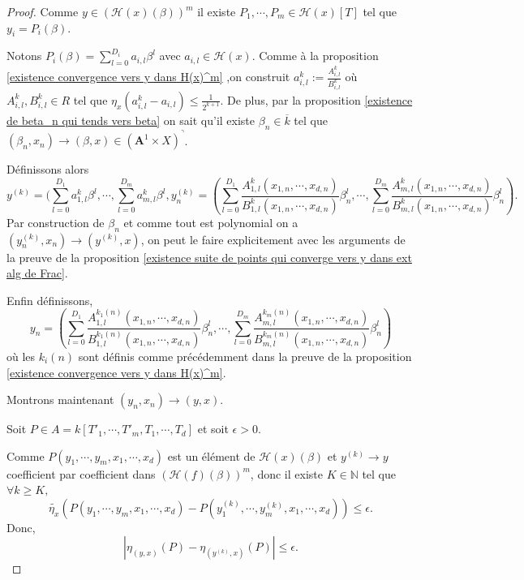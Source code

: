 \documentclass[11pt]{article}
\newcommand{\N}{\mathbb{N}}
\newcommand{\ana}{\mathbf{A}}
\begin{document}
\begin{proof}
Comme $y \in (\mathcal{H}(x)(\beta))^m$ il existe $P_{1}, \cdots, P_{m} \in \mathcal{H}(x)[T]$ tel que $y_{i} = P_{i}(\beta)$. 

Notons $P_{i} (\beta) = \sum\limits_{l=0}^{D_{i}} a_{i,l} \beta^l$ avec $a_{i,l} \in \mathcal{H}(x)$. Comme à la proposition \ref{existence convergence vers y dans H(x)^m} ,on construit $a_{i,l}^k := \frac{A_{i,l}^k}{B_{i,l}^k}$ où $A_{i,l}^k, B_{i,l}^k \in R$ tel que $\eta_x(a_{i,l}^k - a_{i,l}) \leq \frac{1}{2^{k+1}}$. De plus, par la proposition \ref{existence de beta_n qui tends vers beta} on sait qu'il existe $\beta_n \in \overline{k}$ tel que $(\beta_n, x_n) \rightarrow (\beta, x) \in (\ana^1\times X)^\urcorner$. 

Définissons alors 
\begin{equation*}
y^{(k)} = (\sum\limits_{l=0}^{D_{1}} a_{1,l}^k \beta^l, \cdots, \sum\limits_{l=0}^{D_{m}} a_{m,l}^k \beta^l  , y_n^{(k)} = (\sum\limits_{l=0}^{D_{1}} \frac{A_{1,l}^k(x_{1,n}, \cdots, x_{d,n})}{B_{1,l}^k(x_{1,n}, \cdots, x_{d,n})}\beta_n^l, \cdots, \sum\limits_{l=0}^{D_{m}} \frac{A_{m,l}^k(x_{1,n}, \cdots, x_{d,n})}{B_{m,l}^k(x_{1,n}, \cdots, x_{d,n})}\beta_n^l).
\end{equation*}
Par construction de $\beta_n$ et comme tout est polynomial on a $(y_n^{(k)}, x_n) \rightarrow (y^{(k)}, x)$, on peut le faire explicitement avec les arguments de la preuve de la proposition \ref{existence suite de points qui converge vers y dans ext alg de Frac}.

Enfin définissons, 
\begin{equation*}
y_n = (\sum\limits_{l=0}^{D_{1}} \frac{A_{1,l}^{k_{1}(n)}(x_{1,n}, \cdots, x_{d,n})}{B_{1,l}^{k_{1}(n)}(x_{1,n}, \cdots, x_{d,n})}\beta_n^l, \cdots, \sum\limits_{l=0}^{D_{m}} \frac{A_{m,l}^{k_{m}(n)}(x_{1,n}, \cdots, x_{d,n})}{B_{m,l}^{k_{m}(n)}(x_{1,n}, \cdots, x_{d,n})}\beta_n^l)
\end{equation*}
où les $k_{i}(n)$ sont définis comme précédemment dans la preuve de la proposition \ref{existence convergence vers y dans H(x)^m}.

Montrons maintenant $(y_n, x_n) \rightarrow (y,x)$. 

Soit $P \in A =k[T'_1, \cdots, T'_m, T_1, \cdots, T_d]$ et soit $\epsilon >0$. 

Comme $P(y_1, \cdots, y_m, x_1, \cdots, x_d)$ est un élément de $\mathcal{H}(x)(\beta)$ et $y^{(k)} \rightarrow y$ coefficient par coefficient dans $(\mathcal{H}(f)(\beta))^m$, donc il existe $K \in \N$ tel que $\forall k \geq K,$ 
\begin{equation*}
\tilde{\eta_x}(P(y_1, \cdots, y_m, x_1, \cdots, x_d) - P(y^{(k)}_1, \cdots, y^{(k)}_m, x_1, \cdots, x_d))  \leq \epsilon.
\end{equation*}
Donc, 
\begin{equation*}
|\eta_{(y,x)}(P) - \eta_{(y^{(k)}, x)}(P)| \leq \epsilon.
\end{equation*}


\end{proof}
\end{document}
